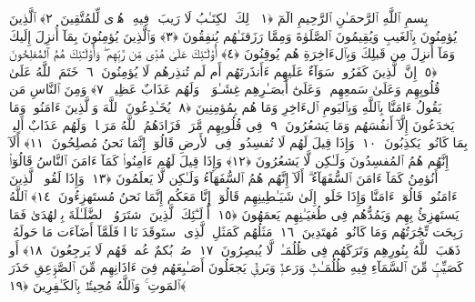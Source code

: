 
  
    
  
    
    

\nopagebreak
  بِسمِ ٱللَّهِ ٱلرَّحمَـٰنِ ٱلرَّحِيمِ
  الٓمٓ ﴿١﴾
 ذَٟلِكَ ٱلكِتَـٰبُ لَا رَيبَ ۛ فِيهِ ۛ هُدًۭى لِّلمُتَّقِينَ ﴿٢﴾
 ٱلَّذِينَ يُؤمِنُونَ بِٱلغَيبِ وَيُقِيمُونَ ٱلصَّلَوٰةَ وَمِمَّا رَزَقنَـٰهُم يُنفِقُونَ ﴿٣﴾
 وَٱلَّذِينَ يُؤمِنُونَ بِمَآ أُنزِلَ إِلَيكَ وَمَآ أُنزِلَ مِن قَبلِكَ وَبِٱلءَاخِرَةِ هُم يُوقِنُونَ ﴿٤﴾
 أُو۟لَـٰٓئِكَ عَلَىٰ هُدًۭى مِّن رَّبِّهِم ۖ وَأُو۟لَـٰٓئِكَ هُمُ ٱلمُفلِحُونَ ﴿٥﴾
 إِنَّ ٱلَّذِينَ كَفَرُوا۟ سَوَآءٌ عَلَيهِم ءَأَنذَرتَهُم أَم لَم تُنذِرهُم لَا يُؤمِنُونَ ﴿٦﴾
 خَتَمَ ٱللَّهُ عَلَىٰ قُلُوبِهِم وَعَلَىٰ سَمعِهِم ۖ وَعَلَىٰٓ أَبصَـٰرِهِم غِشَـٰوَةٌۭ ۖ وَلَهُم عَذَابٌ عَظِيمٌۭ ﴿٧﴾
 وَمِنَ ٱلنَّاسِ مَن يَقُولُ ءَامَنَّا بِٱللَّهِ وَبِٱليَومِ ٱلءَاخِرِ وَمَا هُم بِمُؤمِنِينَ ﴿٨﴾
 يُخَـٰدِعُونَ ٱللَّهَ وَٱلَّذِينَ ءَامَنُوا۟ وَمَا يَخدَعُونَ إِلَّآ أَنفُسَهُم وَمَا يَشعُرُونَ ﴿٩﴾
 فِى قُلُوبِهِم مَّرَضٌۭ فَزَادَهُمُ ٱللَّهُ مَرَضًۭا ۖ وَلَهُم عَذَابٌ أَلِيمٌۢ بِمَا كَانُوا۟ يَكذِبُونَ ﴿١٠﴾
 وَإِذَا قِيلَ لَهُم لَا تُفسِدُوا۟ فِى ٱلأَرضِ قَالُوٓا۟ إِنَّمَا نَحنُ مُصلِحُونَ ﴿١١﴾
 أَلَآ إِنَّهُم هُمُ ٱلمُفسِدُونَ وَلَـٰكِن لَّا يَشعُرُونَ ﴿١٢﴾
 وَإِذَا قِيلَ لَهُم ءَامِنُوا۟ كَمَآ ءَامَنَ ٱلنَّاسُ قَالُوٓا۟ أَنُؤمِنُ كَمَآ ءَامَنَ ٱلسُّفَهَآءُ ۗ أَلَآ إِنَّهُم هُمُ ٱلسُّفَهَآءُ وَلَـٰكِن لَّا يَعلَمُونَ ﴿١٣﴾
 وَإِذَا لَقُوا۟ ٱلَّذِينَ ءَامَنُوا۟ قَالُوٓا۟ ءَامَنَّا وَإِذَا خَلَوا۟ إِلَىٰ شَيَـٰطِينِهِم قَالُوٓا۟ إِنَّا مَعَكُم إِنَّمَا نَحنُ مُستَهزِءُونَ ﴿١٤﴾
 ٱللَّهُ يَستَهزِئُ بِهِم وَيَمُدُّهُم فِى طُغيَـٰنِهِم يَعمَهُونَ ﴿١٥﴾
 أُو۟لَـٰٓئِكَ ٱلَّذِينَ ٱشتَرَوُا۟ ٱلضَّلَـٰلَةَ بِٱلهُدَىٰ فَمَا رَبِحَت تِّجَٰرَتُهُم وَمَا كَانُوا۟ مُهتَدِينَ ﴿١٦﴾
 مَثَلُهُم كَمَثَلِ ٱلَّذِى ٱستَوقَدَ نَارًۭا فَلَمَّآ أَضَآءَت مَا حَولَهُۥ ذَهَبَ ٱللَّهُ بِنُورِهِم وَتَرَكَهُم فِى ظُلُمَـٰتٍۢ لَّا يُبصِرُونَ ﴿١٧﴾
 صُمٌّۢ بُكمٌ عُمىٌۭ فَهُم لَا يَرجِعُونَ ﴿١٨﴾
 أَو كَصَيِّبٍۢ مِّنَ ٱلسَّمَآءِ فِيهِ ظُلُمَـٰتٌۭ وَرَعدٌۭ وَبَرقٌۭ يَجعَلُونَ أَصَـٰبِعَهُم فِىٓ ءَاذَانِهِم مِّنَ ٱلصَّوَٟعِقِ حَذَرَ ٱلمَوتِ ۚ وَٱللَّهُ مُحِيطٌۢ بِٱلكَـٰفِرِينَ ﴿١٩﴾
